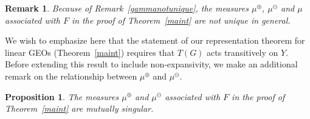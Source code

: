 \documentclass[11pt]{article}
\newtheorem{proposition}[theorem]{Proposition}
\newtheorem{rem}[theorem]{Remark}
\begin{document}

\begin{rem}\label{measurenotunique}
Because of Remark~\ref{gammanotunique}, the measures $\mu^\oplus$, $\mu^\ominus$ and $\mu$ associated with $F$ in the proof of Theorem~\ref{maint} are not unique in general.
\end{rem}

We wish to emphasize here that the statement of our representation theorem for
linear GEOs (Theorem~\ref{maint}) requires that $T(G)$ acts transitively on $Y$. Before extending this result to include non-expansivity, we make an additional remark on the relationship between $\mu^\oplus$ and $\mu^\ominus$.

\begin{proposition}
    \label{prop:singular}
    The measures $\mu^\oplus$ and $\mu^\ominus$ associated with $F$ in the proof of Theorem~\ref{maint} are mutually singular.
\end{proposition}

\end{document}
